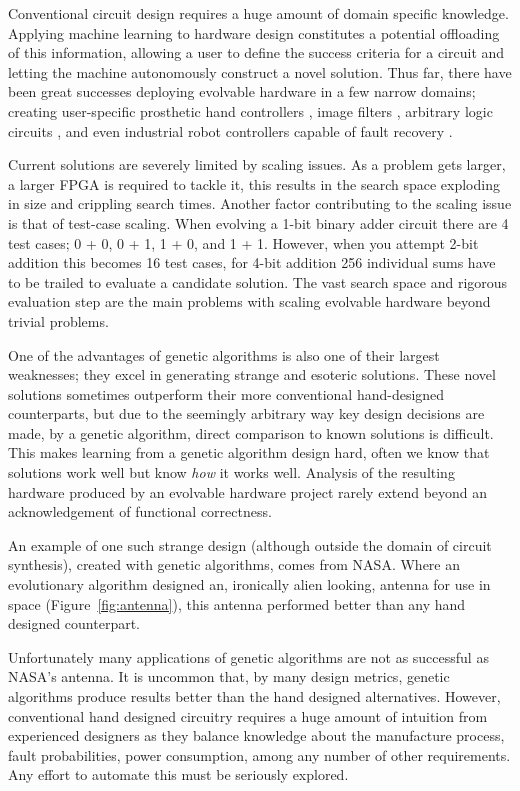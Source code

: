 Conventional circuit design requires a huge amount of domain specific knowledge.
Applying machine learning to hardware design constitutes a potential
offloading of this information, allowing a user to define the success
criteria for a circuit and letting the machine autonomously construct a novel solution.
Thus far, there have been great successes deploying evolvable hardware in a few
narrow domains; creating
user-specific prosthetic hand controllers \cite{Kajitani1999AnEH},
image filters \cite{HybridFilter}, arbitrary logic circuits
\cite{Vasicek2011}, and even industrial robot controllers capable of fault recovery \cite{10.1007/3-540-61093-6_6}.

Current solutions are severely limited by scaling issues. As a problem
gets larger, a larger FPGA is required to tackle it, this results in the
search space exploding in size and crippling search times. Another factor
contributing to the scaling issue is that of test-case scaling. When evolving
a 1-bit binary adder circuit there are 4 test cases; 0 + 0, 0 + 1, 1 + 0, and
1 + 1. However, when you attempt 2-bit addition this becomes 16 test cases,
for 4-bit addition 256 individual sums have to be trailed to evaluate a
candidate solution.
The vast search space and rigorous evaluation step
are the main problems with scaling evolvable hardware beyond trivial problems.

One of the advantages of genetic algorithms is also one of their largest
weaknesses; they excel in generating strange and esoteric solutions.
These novel solutions sometimes
outperform their more conventional hand-designed counterparts,
but due to the seemingly arbitrary way key design decisions are made,
by a genetic algorithm, direct comparison to known solutions is difficult. This makes
learning from a genetic algorithm design hard, often we know that solutions
work well but know {\em how} it works well. Analysis of the resulting hardware
produced by an evolvable hardware project rarely
extend beyond an acknowledgement of functional correctness.

An example of one such strange design
(although outside the domain of circuit synthesis),
created with genetic algorithms,
comes from NASA. Where an evolutionary algorithm designed an, ironically
alien looking, antenna for use in space (Figure~\ref{fig:antenna})\cite{Antenna}, this antenna performed better
than any hand designed counterpart.

Unfortunately many applications of genetic algorithms are not as
successful as NASA's antenna.
It is uncommon that, by many design metrics, genetic algorithms produce results
better than the hand designed alternatives. However, conventional hand designed
circuitry requires
a huge amount of intuition from experienced designers as they balance
knowledge about the manufacture process, fault probabilities, power
consumption, among any number of other requirements. Any effort to automate
this must be seriously explored.

